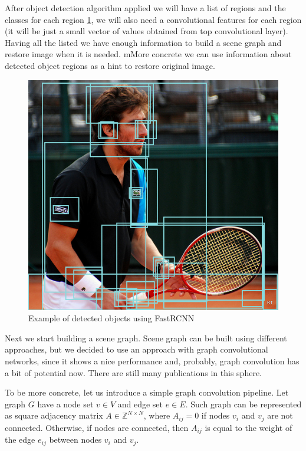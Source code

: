 After object detection algorithm applied we will have a list of regions and the classes for each region \ref{objects-detected}, we will also need a convolutional features for each region (it will be just a small vector of values obtained from top convolutional layer). Having all the listed we have enough information to build a scene graph and restore image when it is needed. mMore concrete we can use information about detected object regions as a hint to restore original image.

\begin{figure}[!h]
    \centering
    \includegraphics[width=\textwidth]{figure/object-detected.png}
    \caption{Example of detected objects using FastRCNN}
    \label{objects-detected}
\end{figure}

Next we start building a scene graph. Scene graph can be built using different approaches, but we decided to use an approach with graph convolutional networks, since it shows a nice performance and, probably, graph convolution has a bit of potential now. There are still many publications in this sphere.

To be more concrete, let us introduce a simple graph convolution pipeline. Let graph $G$ have a node set $v\in V$ and edge set $e\in E$. Such graph can be represented as square adjacency matrix $A\in \mathbb{Z}^{N\times N}$, where $A_{ij}=0$ if nodes $v_i$ and $v_j$ are not connected. Otherwise, if nodes are connected, then $A_{ij}$ is equal to the weight of the edge $e_{ij}$ between nodes $v_i$ and $v_j$.

